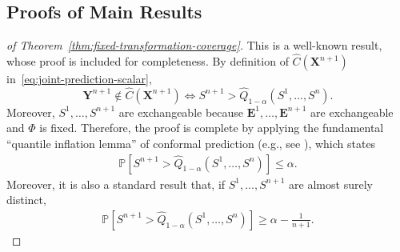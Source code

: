 \subsection{Proofs of Main Results}
\label{app:proofs-thms}

\begin{proof}[of Theorem~\ref{thm:fixed-transformation-coverage}]
This is a well-known result, whose proof is included for completeness. 
By definition of $\hat{C}(\mathbf{X}^{n+1})$ in~\eqref{eq:joint-prediction-scalar},
\[
 \mathbf{Y}^{n+1} \notin \hat{C}(\mathbf{X}^{n+1}) \Longleftrightarrow S^{n+1} > \hat{Q}_{1-\alpha}(S^1,\ldots,S^n).
\]
Moreover, $S^1,\ldots,S^{n+1}$ are exchangeable because $\mathbf{E}^1,\ldots,\mathbf{E}^{n+1}$ are exchangeable and $\Phi$ is fixed.
Therefore, the proof is complete by applying the fundamental ``quantile inflation lemma'' of conformal prediction (e.g., see \citet{angelopoulos2025theoreticalfoundationsconformalprediction}), which states 
\begin{align*}
  \mathbb{P}\left[ S^{n+1} > \hat{Q}_{1-\alpha}(S^1,\ldots,S^n) \right] \leq \alpha.
\end{align*}
Moreover, it is also a standard result that, if $S^1,\ldots,S^{n+1}$ are almost surely distinct,
\begin{align*}
  \mathbb{P}\left[ S^{n+1} > \hat{Q}_{1-\alpha}(S^1,\ldots,S^n) \right] \geq \alpha - \frac{1}{n+1}.
\end{align*}
\end{proof}


